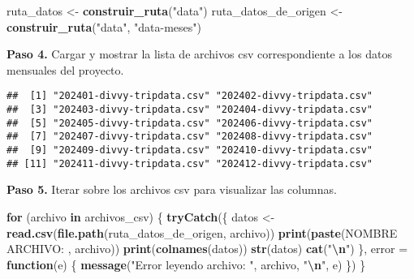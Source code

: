 \documentclass[
]{article}
\newenvironment{Shaded}{\begin{snugshade}}{\end{snugshade}}
\newcommand{\AttributeTok}[1]{\textcolor[rgb]{0.13,0.29,0.53}{#1}}
\newcommand{\ConstantTok}[1]{\textcolor[rgb]{0.56,0.35,0.01}{#1}}
\newcommand{\ControlFlowTok}[1]{\textcolor[rgb]{0.13,0.29,0.53}{\textbf{#1}}}
\newcommand{\FunctionTok}[1]{\textcolor[rgb]{0.13,0.29,0.53}{\textbf{#1}}}
\newcommand{\NormalTok}[1]{#1}
\newcommand{\OtherTok}[1]{\textcolor[rgb]{0.56,0.35,0.01}{#1}}
\newcommand{\SpecialCharTok}[1]{\textcolor[rgb]{0.81,0.36,0.00}{\textbf{#1}}}
\newcommand{\StringTok}[1]{\textcolor[rgb]{0.31,0.60,0.02}{#1}}
\begin{document}
\begin{Shaded}
\begin{Highlighting}[]
\NormalTok{ruta\_datos }\OtherTok{\textless{}{-}} \FunctionTok{construir\_ruta}\NormalTok{(}\StringTok{"data"}\NormalTok{) }
\NormalTok{ruta\_datos\_de\_origen }\OtherTok{\textless{}{-}} \FunctionTok{construir\_ruta}\NormalTok{(}\StringTok{"data"}\NormalTok{, }\StringTok{"data{-}meses"}\NormalTok{)}
\end{Highlighting}
\end{Shaded}

\hfill\break
\textbf{Paso 4.} Cargar y mostrar la lista de archivos csv
correspondiente a los datos mensuales del proyecto.

\begin{Shaded}
\end{Shaded}

\begin{verbatim}
##  [1] "202401-divvy-tripdata.csv" "202402-divvy-tripdata.csv"
##  [3] "202403-divvy-tripdata.csv" "202404-divvy-tripdata.csv"
##  [5] "202405-divvy-tripdata.csv" "202406-divvy-tripdata.csv"
##  [7] "202407-divvy-tripdata.csv" "202408-divvy-tripdata.csv"
##  [9] "202409-divvy-tripdata.csv" "202410-divvy-tripdata.csv"
## [11] "202411-divvy-tripdata.csv" "202412-divvy-tripdata.csv"
\end{verbatim}

\hfill\break
\textbf{Paso 5.} Iterar sobre los archivos csv para visualizar las
columnas.

\begin{Shaded}
\begin{Highlighting}[]
\ControlFlowTok{for}\NormalTok{ (archivo }\ControlFlowTok{in}\NormalTok{ archivos\_csv) \{ }
  \FunctionTok{tryCatch}\NormalTok{(\{}
\NormalTok{    datos }\OtherTok{\textless{}{-}} \FunctionTok{read.csv}\NormalTok{(}\FunctionTok{file.path}\NormalTok{(ruta\_datos\_de\_origen, archivo)) }
    \FunctionTok{print}\NormalTok{(}\FunctionTok{paste}\NormalTok{(}\StringTok{\textquotesingle{}NOMBRE ARCHIVO: \textquotesingle{}}\NormalTok{, archivo))}
    \FunctionTok{print}\NormalTok{(}\FunctionTok{colnames}\NormalTok{(datos))}
    \FunctionTok{str}\NormalTok{(datos)}
    \FunctionTok{cat}\NormalTok{(}\StringTok{"}\SpecialCharTok{\textbackslash{}n}\StringTok{"}\NormalTok{)}
\NormalTok{  \}, }\AttributeTok{error =} \ControlFlowTok{function}\NormalTok{(e) \{}
    \FunctionTok{message}\NormalTok{(}\StringTok{"Error leyendo archivo: "}\NormalTok{, archivo, }\StringTok{"}\SpecialCharTok{\textbackslash{}n}\StringTok{"}\NormalTok{, e)}
\NormalTok{  \})}
\NormalTok{\}}
\end{Highlighting}
\end{Shaded}
\end{document}
